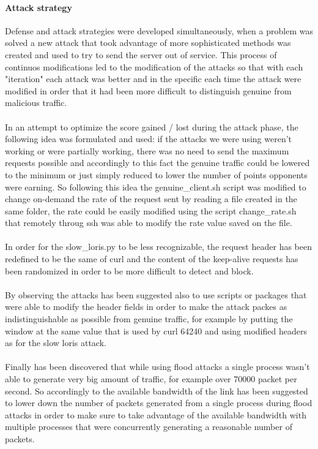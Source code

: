 \documentclass[14pt]{article}
\begin{document}
\paragraph{Attack strategy}
Defense and attack strategies were developed simultaneously, when a problem was solved a new attack that took advantage of more sophisticated methods was created and used to try to send the server out of service. This process of continuos modifications led to the modification of the attacks so that with each "iteration" each attack was better and in the specific each time the attack were modified in order that it had been more difficult to distinguish genuine from malicious traffic. 
\\
\\
In an attempt to optimize the score gained / lost during the attack phase, the following idea was formulated and used: if the attacks we were using weren't working or were partially working, there was no need to send the maximum requests possible and accordingly to this fact the genuine traffic could be lowered to the minimum or just simply reduced to lower the number of points opponents were earning. So following this idea the genuine\_client.sh script was modified to change on-demand the rate of the request sent by reading a file created in the same folder, the rate could be easily modified using the script change\_rate.sh that remotely throug ssh was able to modify the rate value saved on the file.
\\
\\
In order for the slow\_loris.py to be less recognizable, the request header has been redefined to be the same of curl and the content of the keep-alive requests has been randomized in order to be more difficult to detect and block. 
\\
\\
By observing the attacks has been suggested also to use scripts or packages that were able to modify the header fields in order to make the attack packes as indistinguishable as possible from genuine traffic, for example by putting the window at the same value that is used by curl 64240 and using modified headers as for the slow loris attack.
\\
\\
Finally has been discovered that while using flood attacks a single process wasn't able to generate very big amount of traffic, for example over 70000 packet per second. So accordingly to the available bandwidth of the link has been suggested to lower down the number of packets generated from a single process during flood attacks in order to make sure to take advantage of the available bandwidth with multiple processes that were concurrently generating a reasonable number of packets.
\end{document}
